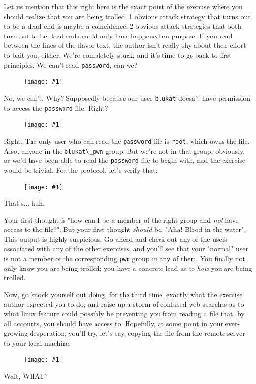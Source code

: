 \documentclass{article}
\newcommand{\displayimage}[1] {
\begin{figure}[H]
    \centering
    \texttt{[image: \#1]} 
\end{figure}
}
\newcommand{\xcode}[2]{\colorbox{ubuntuback}{\lstinline[language=#1]|#2|}}
\newcommand{\code}[1]{\colorbox{ubuntuback}{\texttt{#1}}}
\begin{document}
Let us mention that this right here is the exact point of the exercise where you should realize that you are being trolled. 1 obvious attack strategy that turns out to be a dead end is maybe a coincidence; 2 obvious attack strategies that both turn out to be dead ends could only have happened on purpose. If you read between the lines of the flavor text, the author isn't really shy about their effort to bait you, either.  We're completely stuck, and it's time to go back to first principles. We can't read \xcode{C}{password}, can we?  
\displayimage{./exercises/19_blukat/cat_password.png}

No, we can't. Why? Supposedly because our user \xcode{bash}{blukat} doesn't have permission to access the \xcode{bash}{password} file. Right?

\displayimage{./exercises/19_blukat/file_permissions.png}

Right. The only user who can read the \xcode{bash}{password} file is \xcode{bash}{root}, which owns the file. Also, anyone in the \xcode{bash}{blukat\_pwn} group. But we're not in that group, obviously, or we'd have been able to read the \xcode{bash}{password} file to begin with, and the exercise would be trivial. For the protocol, let's verify that:

\displayimage{./exercises/19_blukat/group_check.png}

That's... huh.

Your first thought is "how can I be a member of the right group and \textit{not} have access to the file?". But your first thought \textit{should} be, "Aha! Blood in the water". This output is highly suspicious. Go ahead and check out any of the users associated with any of the other exercises, and you'll see that your "normal" user is not a member of the corresponding \code{pwn} group in any of them. You finally not only know you are being trolled; you have a concrete lead as to \textit{how} you are being trolled.

Now, go knock yourself out doing, for the third time, exactly what the exercise author expected you to do, and raise up a storm of confused web searches as to what linux feature could possibly be preventing you from reading a file that, by all accounts, you should have access to. Hopefully, at some point in your ever-growing desperation, you'll try, let's say, copying the file from the remote server to your local machine:

\displayimage{./exercises/19_blukat/locally.png}

Wait, WHAT?
\end{document}
